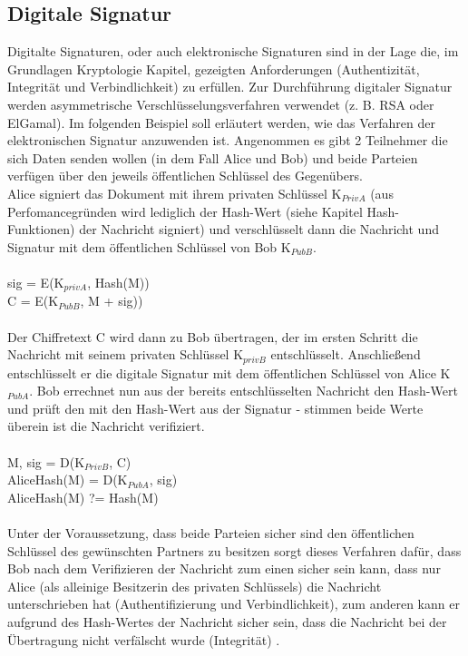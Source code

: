 \documentclass[10pt, a4paper,headsepline]{scrreprt}
\begin{document}
\subsection{Digitale Signatur}
Digitalte Signaturen, oder auch elektronische Signaturen sind in der Lage die, im Grundlagen Kryptologie Kapitel, gezeigten Anforderungen (Authentizität, Integrität und Verbindlichkeit) zu erfüllen. Zur Durchführung digitaler Signatur werden asymmetrische Verschlüsselungsverfahren verwendet (z. B. RSA oder ElGamal). Im folgenden Beispiel soll erläutert werden, wie das Verfahren der elektronischen Signatur anzuwenden ist. Angenommen es gibt 2 Teilnehmer die sich Daten senden wollen (in dem Fall Alice und Bob) und beide Parteien verfügen über den jeweils öffentlichen Schlüssel des Gegenübers. \\
Alice signiert das Dokument mit ihrem privaten Schlüssel K$_{PrivA}$ (aus Perfomancegründen wird lediglich der Hash-Wert (siehe Kapitel Hash-Funktionen) der Nachricht signiert) und verschlüsselt dann die Nachricht und Signatur mit dem öffentlichen Schlüssel von Bob K$_{PubB}$. \\ \\
sig =  E(K$_{privA}$, Hash(M)) \\
C = E(K$_{PubB}$, M + sig)) \\ \\
Der Chiffretext C wird dann zu Bob übertragen, der im ersten Schritt die Nachricht mit seinem privaten Schlüssel K$_{privB}$ entschlüsselt. Anschließend entschlüsselt er die digitale Signatur mit dem öffentlichen Schlüssel von Alice K$_{PubA}$. Bob errechnet nun aus der bereits entschlüsselten Nachricht den Hash-Wert und prüft den mit den Hash-Wert aus der Signatur - stimmen beide Werte überein ist die Nachricht verifiziert. \\ \\
M, sig = D(K$_{PrivB}$, C) \\
AliceHash(M) = D(K$_{PubA}$, sig) \\
AliceHash(M) ?= Hash(M) \\ \\
Unter der Voraussetzung, dass beide Parteien sicher sind den öffentlichen Schlüssel des gewünschten Partners zu besitzen sorgt dieses Verfahren dafür, dass Bob nach dem Verifizieren der Nachricht zum einen sicher sein kann, dass nur Alice (als alleinige Besitzerin des privaten Schlüssels) die Nachricht unterschrieben hat (Authentifizierung und Verbindlichkeit), zum anderen kann er aufgrund des Hash-Wertes der Nachricht sicher sein, dass die Nachricht bei der Übertragung nicht verfälscht wurde (Integrität) \citep[S. 391ff]{book:it-sicherheit}.
\end{document}
